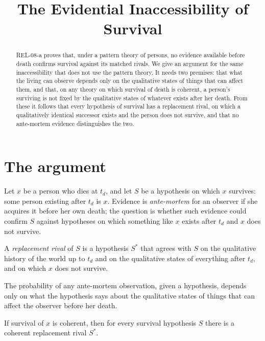\documentclass{situationist-preprint}
\title{The Evidential Inaccessibility of Survival}
\begin{document}
\maketitle

\begin{abstract}
REL-08-a proves that, under a pattern theory of persons, no evidence available before death confirms survival against its matched rivals. We give an argument for the same inaccessibility that does not use the pattern theory. It needs two premises: that what the living can observe depends only on the qualitative states of things that can affect them, and that, on any theory on which survival of death is coherent, a person's surviving is not fixed by the qualitative states of whatever exists after her death. From these it follows that every hypothesis of survival has a replacement rival, on which a qualitatively identical successor exists and the person does not survive, and that no ante-mortem evidence distinguishes the two.
\end{abstract}

\section{The argument}

Let $x$ be a person who dies at $t_d$, and let $S$ be a hypothesis on which $x$ survives: some person existing after $t_d$ is $x$. Evidence is \emph{ante-mortem} for an observer if she acquires it before her own death; the question is whether such evidence could confirm $S$ against hypotheses on which something like $x$ exists after $t_d$ and $x$ does not survive.

\begin{definition}\label{d:rival}
A \emph{replacement rival} of $S$ is a hypothesis $S^{*}$ that agrees with $S$ on the qualitative history of the world up to $t_d$ and on the qualitative states of everything after $t_d$, and on which $x$ does not survive.
\end{definition}

\begin{assumption}\label{a:local}
The probability of any ante-mortem observation, given a hypothesis, depends only on what the hypothesis says about the qualitative states of things that can affect the observer before her death.
\end{assumption}

\begin{assumption}\label{a:nonsup}
If survival of $x$ is coherent, then for every survival hypothesis $S$ there is a coherent replacement rival $S^{*}$.
\end{assumption}
\end{document}
